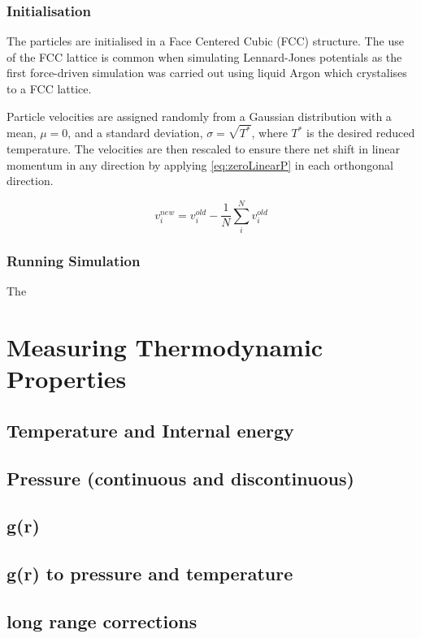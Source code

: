 \documentclass[12pt]{UoAthesis}
\begin{document}
\subsection{Initialisation} The particles are initialised in a Face Centered
Cubic (FCC)  structure. The
use of the FCC lattice is common when simulating Lennard-Jones
potentials as the first force-driven simulation \cite{Rahman1964} was
carried out using liquid Argon which crystalises to a FCC lattice.

Particle velocities are assigned randomly from a Gaussian distribution
with a mean, $\mu = 0$, and a standard deviation, $\sigma =
\sqrt{T^{*}}$, where $T^{*}$ is the desired reduced temperature. The
velocities are then rescaled to ensure there net shift in linear
momentum in any direction by applying \eqref{eq:zeroLinearP} in each
orthongonal direction.

\begin{equation} 
  v_{i}^{new} = v_{i}^{old} - \frac{1}{N}
  \sum^{N}_{i}v_{i}^{old}
  \label{eq:zeroLinearP} 
\end{equation}

\subsection{Running Simulation} 
The


\chapter{Measuring Thermodynamic Properties}

\section{Temperature and Internal energy }
\section{Pressure (continuous and discontinuous)}
\section{g(r)}
\section{g(r) to pressure and temperature}
\section{long range corrections}
\end{document}

